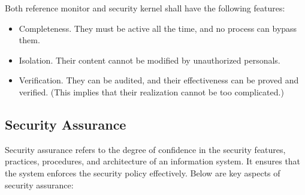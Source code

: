 Both reference monitor and security kernel shall have the following features:
\begin{itemize}
  \item Completeness. They must be active all the time, and no process can bypass them.
  \item Isolation. Their content cannot be modified by unauthorized personals.
  \item Verification. They can be audited, and their effectiveness can be proved and verified. (This implies that their realization cannot be too complicated.)
\end{itemize}

\subsection{Security Assurance}

Security assurance refers to the degree of confidence in the security features, practices, procedures, and architecture of an information system. It ensures that the system enforces the security policy effectively. Below are key aspects of security assurance:

